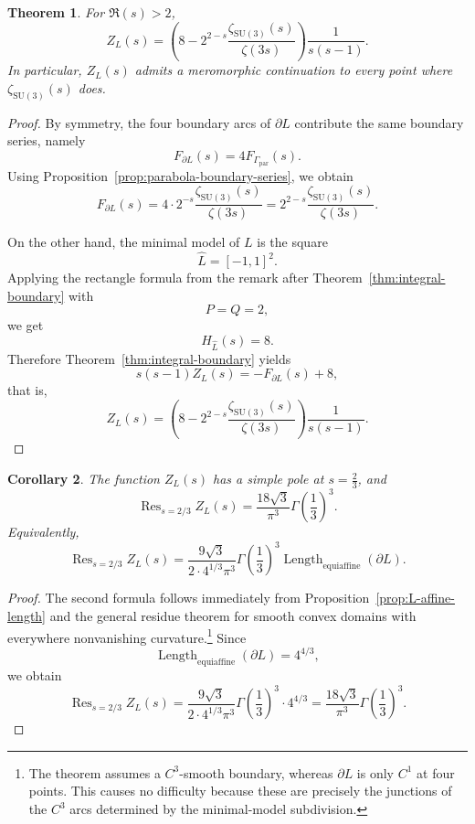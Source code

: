 \documentclass[a4paper,american,11pt]{amsart}
\theoremstyle{plain}
\newtheorem{theorem}{Theorem}[section]
\newtheorem{corollary}[theorem]{Corollary}
\theoremstyle{definition}
\DeclareMathOperator*{\Res}{Res}
\DeclareMathOperator{\Length}{Length}
\begin{document}
\begin{theorem}\label{thm:L-zeta}
For \(\Re(s)>2\),
\[
Z_L(s)
=
\left(
8-2^{2-s}\frac{\zeta_{\mathrm{SU}(3)}(s)}{\zeta(3s)}
\right)\frac{1}{s(s-1)}.
\]
In particular, \(Z_L(s)\) admits a meromorphic continuation to every point
where \(\zeta_{\mathrm{SU}(3)}(s)\) does.
\end{theorem}

\begin{proof}
By symmetry, the four boundary arcs of \(\partial L\) contribute the same
boundary series, namely
\[
F_{\partial L}(s)=4F_{\Gamma_{\mathrm{par}}}(s).
\]
Using Proposition~\ref{prop:parabola-boundary-series}, we obtain
\[
F_{\partial L}(s)
=
4\cdot 2^{-s}\frac{\zeta_{\mathrm{SU}(3)}(s)}{\zeta(3s)}
=
2^{2-s}\frac{\zeta_{\mathrm{SU}(3)}(s)}{\zeta(3s)}.
\]

On the other hand, the minimal model of \(L\) is the square
\[
\widehat L=[-1,1]^2.
\]
Applying the rectangle formula from the remark after
Theorem~\ref{thm:integral-boundary} with
\[
P=Q=2,
\]
we get
\[
H_{\widehat L}(s)=8.
\]
Therefore Theorem~\ref{thm:integral-boundary} yields
\[
s(s-1)Z_L(s)
=
-F_{\partial L}(s)+8,
\]
that is,
\[
Z_L(s)
=
\left(
8-2^{2-s}\frac{\zeta_{\mathrm{SU}(3)}(s)}{\zeta(3s)}
\right)\frac{1}{s(s-1)}.
\]
\end{proof}

\begin{corollary}\label{cor:L-residue}
The function \(Z_L(s)\) has a simple pole at \(s=\frac23\), and
\[
\Res_{s=2/3} Z_L(s)
=
\frac{18\sqrt3}{\pi^3}\Gamma\!\left(\frac13\right)^3.
\]
Equivalently,
\[
\Res_{s=2/3} Z_L(s)
=
\frac{9\sqrt3}{2\cdot 4^{1/3}\pi^3}
\Gamma\!\left(\frac13\right)^3
\Length_{\mathrm{equiaffine}}(\partial L).
\]
\end{corollary}

\begin{proof}
The second formula follows immediately from Proposition~\ref{prop:L-affine-length}
and the general residue theorem for smooth convex domains with everywhere
nonvanishing curvature.\footnote{The theorem assumes a \(C^3\)-smooth boundary, whereas \(\partial L\) is only \(C^1\) at four points. This causes no difficulty because these are precisely the junctions of the \(C^3\) arcs determined by the minimal-model subdivision.} Since
\[
\Length_{\mathrm{equiaffine}}(\partial L)=4^{4/3},
\]
we obtain
\[
\Res_{s=2/3} Z_L(s)
=
\frac{9\sqrt3}{2\cdot 4^{1/3}\pi^3}
\Gamma\!\left(\frac13\right)^3
\cdot 4^{4/3}
=
\frac{18\sqrt3}{\pi^3}\Gamma\!\left(\frac13\right)^3.
\]
\end{proof}
\end{document}

